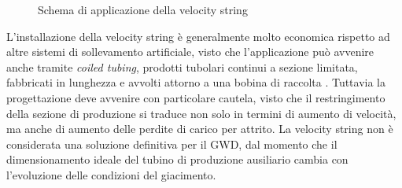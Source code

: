 \begin{figure}[htbp]
\centering
     \quad
    \caption{Schema di applicazione della velocity string \parencite{arachman2004liquid}} 
    \label{fig:velocitystring}
\end{figure}

L'installazione della velocity string è generalmente molto economica rispetto ad altre sistemi di sollevamento artificiale, visto che l'applicazione può avvenire anche tramite \textit{coiled tubing}, prodotti tubolari continui a sezione limitata, fabbricati in lunghezza e avvolti attorno a una bobina di raccolta \parencite{international2014introduction}. Tuttavia la progettazione deve avvenire con particolare cautela, visto che il restringimento della sezione di produzione si traduce non solo in termini di aumento di velocità, ma anche di aumento delle perdite di carico per attrito. La velocity string non è considerata una soluzione definitiva per il GWD, dal momento che il dimensionamento ideale del tubino di produzione ausiliario cambia con l'evoluzione delle condizioni del giacimento.

